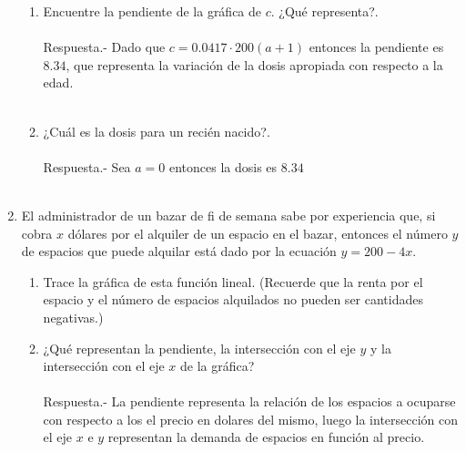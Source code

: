 \begin{enumerate}
\begin{enumerate}[\bfseries (a)]
	\item Encuentre la pendiente de la gráfica de $c$. ¿Qué representa?.\\\\
	    Respuesta.-\; Dado que $c=0.0417\cdot 200 (a+1)$ entonces la pendiente es $8.34$, que representa la variación de la dosis apropiada con respecto a la edad.\\\\

	\item ¿Cuál es la dosis para un recién nacido?.\\\\
	    Respuesta.-\; Sea $a=0$ entonces la dosis es $8.34$\\\\

    \end{enumerate}

    \item El administrador de un bazar de fi de semana sabe por experiencia que, si cobra $x$ dólares por el alquiler de un espacio en el bazar, entonces el número $y$ de espacios que puede alquilar está dado por la ecuación $y=200-4x$.
    \begin{enumerate}[\bfseries (a)]
	
	\item Trace la gráfica de esta función lineal. (Recuerde que la renta por el espacio y el número de espacios alquilados no pueden ser cantidades negativas.)\\
	\begin{center}
	\end{center}
	\vspace{0.5cm}

	\item ¿Qué representan la pendiente, la intersección con el eje $y$ y la intersección con el eje $x$ de la gráfica?\\\\
	    Respuesta.-\; La pendiente representa la relación de los espacios a ocuparse con respecto a los el precio en dolares del mismo, luego la intersección con el eje $x$ e $y$ representan la demanda de espacios en función al precio.\\\\ 
	    

\end{enumerate}
\end{enumerate}
